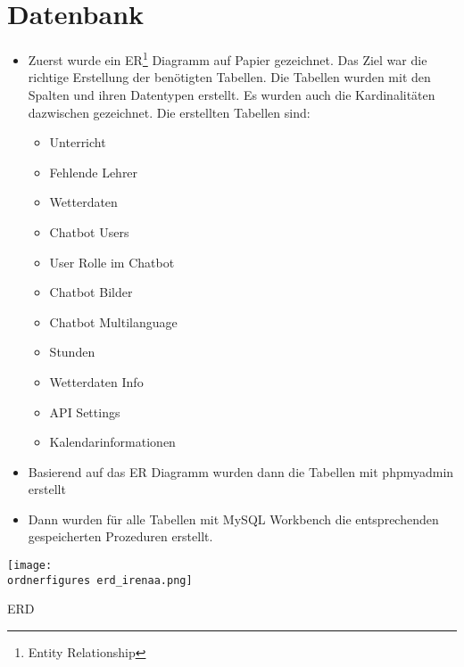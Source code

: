 \section{Datenbank}
\begin{itemize}
	\item Zuerst wurde ein ER\footnote{Entity Relationship} Diagramm auf Papier gezeichnet. Das Ziel war die richtige Erstellung der benötigten Tabellen. Die Tabellen wurden mit den Spalten und ihren Datentypen erstellt. Es wurden auch die Kardinalitäten dazwischen gezeichnet. Die erstellten Tabellen sind:
	
	\begin{itemize}
		\item Unterricht
	\end{itemize}
    \begin{itemize}
    	\item Fehlende Lehrer
    \end{itemize}
    \begin{itemize}
    	\item Wetterdaten
    \end{itemize}
    \begin{itemize}
	\item Chatbot Users
    \end{itemize}	
	\begin{itemize}
		\item User Rolle im Chatbot
	\end{itemize}
	\begin{itemize}
		\item Chatbot Bilder
	\end{itemize}
	\begin{itemize}
		\item Chatbot Multilanguage
	\end{itemize}
	\begin{itemize}
		\item Stunden
	\end{itemize}
	\begin{itemize}
		\item Wetterdaten Info
	\end{itemize}
	\begin{itemize}
		\item API Settings
	\end{itemize}
	\begin{itemize}
	\item Kalendarinformationen
	\end{itemize}
\end{itemize}
\begin{itemize}
	\item Basierend auf das ER Diagramm wurden dann die Tabellen mit phpmyadmin erstellt
\end{itemize}
\begin{itemize}
	\item Dann wurden für alle Tabellen mit MySQL Workbench die entsprechenden gespeicherten Prozeduren erstellt. 
\end{itemize}
\captionsetup{type=figure}
\texttt{[image: \\ordnerfigures erd\_irenaa.png]}
\caption{ERD}
\label{erd} 
\captionsetup{type=figure} 	
